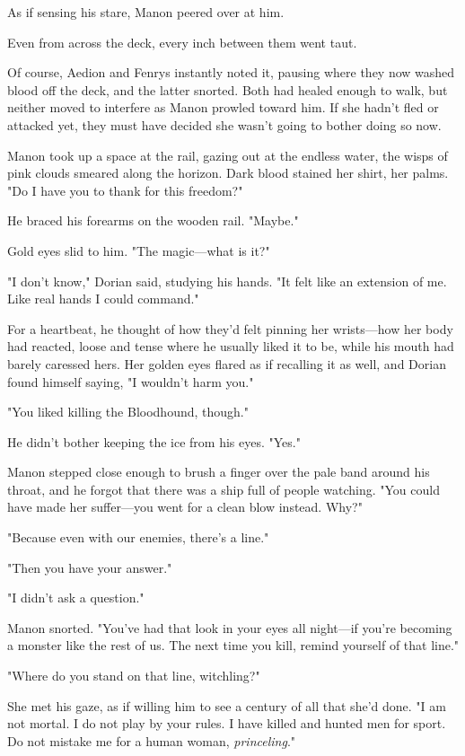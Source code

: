 As if sensing his stare, Manon peered over at him.

Even from across the deck, every inch between them went taut.

Of course, Aedion and Fenrys instantly noted it, pausing where they now washed blood off the deck, and the latter snorted.
Both had healed enough to walk, but neither moved to interfere as Manon prowled toward him.
If she hadn't fled or attacked yet, they must have decided she wasn't going to bother doing so now.

Manon took up a space at the rail, gazing out at the endless water, the wisps of pink clouds smeared along the horizon.
Dark blood stained her shirt, her palms.
"Do I have you to thank for this freedom?"

He braced his forearms on the wooden rail.
"Maybe."

Gold eyes slid to him.
"The magic---what is it?"

"I don't know," Dorian said, studying his hands.
"It felt like an extension of me.
Like real hands I could command."

For a heartbeat, he thought of how they'd felt pinning her wrists---how her body had reacted, loose and tense where he usually liked it to be, while his mouth had barely caressed hers.
Her golden eyes flared as if recalling it as well, and Dorian found himself saying, "I wouldn't harm you."

"You liked killing the Bloodhound, though."

He didn't bother keeping the ice from his eyes.
"Yes."

Manon stepped close enough to brush a finger over the pale band around his throat, and he forgot that there was a ship full of people watching.
"You could have made her suffer---you went for a clean blow instead.
Why?"

"Because even with our enemies, there's a line."

"Then you have your answer."

"I didn't ask a question."

Manon snorted.
"You've had that look in your eyes all night---if you're becoming a monster like the rest of us.
The next time you kill, remind yourself of that line."

"Where do you stand on that line, witchling?"

She met his gaze, as if willing him to see a century of all that she'd done.
"I am not mortal.
I do not play by your rules.
I have killed and hunted men for sport.
Do not mistake me for a human woman,
\emph{princeling}."

